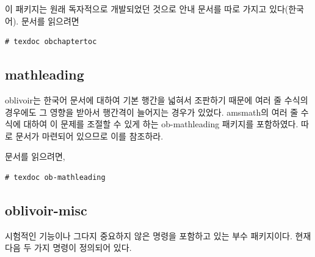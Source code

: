 \documentclass[
	12pt,
	a4paper,
	kosection,
	footnote,
	microtype,
	figtabcapt,
]{oblivoir}
\begin{document}
\begin{boxedverbatim}
\usepackage{obchaptertoc}
\chaptertoc
\end{boxedverbatim}

이 패키지는 원래 독자적으로 개발되었던 것으로 안내 문서를 따로 가지고 있다(한국어).
문서를 읽으려면
\begin{verbatim}
# texdoc obchaptertoc
\end{verbatim}

\subsection{mathleading}

oblivoir는 한국어 문서에 대하여 기본 행간을 넓혀서 조판하기 때문에 여러 줄 수식의 경우에도
그 영향을 받아서 행간격이 늘어지는 경우가 있었다.
\textsf{amsmath}의 여러 줄 수식에 대하여 이 문제를 조절할 수 있게 하는 \textsf{ob-mathleading}
패키지를 포함하였다. 따로 문서가 마련되어 있으므로 이를 참조하라.

\begin{boxedverbatim}
\usepackage{ob-mathleading}
\end{boxedverbatim}

문서를 읽으려면,
\begin{verbatim}
# texdoc ob-mathleading
\end{verbatim}

\subsection{oblivoir-misc}

시험적인 기능이나 그다지 중요하지 않은 명령을 포함하고 있는 
부수 패키지이다. 현재 다음 두 가지 명령이 정의되어 있다.
\end{document}
